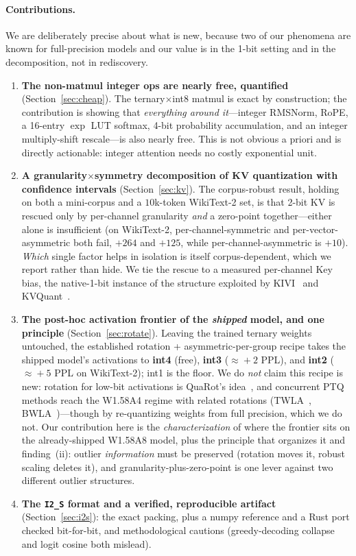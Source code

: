 \documentclass[11pt]{article}
\begin{document}
\paragraph{Contributions.} We are deliberately precise about what is new, because
two of our phenomena are known for full-precision models and our value is in the
1-bit setting and in the decomposition, not in rediscovery.
\begin{enumerate}
\item \textbf{The non-matmul integer ops are nearly free, quantified}
(Section~\ref{sec:cheap}). The ternary$\times$int8 matmul is exact by construction;
the contribution is showing that \emph{everything around it}---integer RMSNorm,
RoPE, a 16-entry $\exp$ LUT softmax, 4-bit probability accumulation, and an integer
multiply-shift rescale---is also nearly free. This is not obvious a priori and is
directly actionable: integer attention needs no costly exponential unit.
\item \textbf{A granularity$\times$symmetry decomposition of KV quantization with
confidence intervals} (Section~\ref{sec:kv}). The corpus-robust result, holding on
both a mini-corpus and a $10$k-token WikiText-2 set, is that 2-bit KV is rescued only
by per-channel granularity \emph{and} a zero-point together---either alone is
insufficient (on WikiText-2, per-channel-symmetric and per-vector-asymmetric both
fail, $+264$ and $+125$, while per-channel-asymmetric is $+10$). \emph{Which} single
factor helps in isolation is itself corpus-dependent, which we report rather than
hide. We tie the rescue to a measured per-channel Key bias, the native-1-bit instance
of the structure exploited by KIVI~\cite{liu2024kivi} and KVQuant~\cite{hooper2024kvquant}.
\item \textbf{The post-hoc activation frontier of the \emph{shipped} model, and one
principle} (Section~\ref{sec:rotate}). Leaving the trained ternary weights untouched,
the established rotation + asymmetric-per-group recipe takes the shipped model's
activations to \textbf{int4} (free), \textbf{int3} ($\approx\!+2$ PPL), and
\textbf{int2} ($\approx\!+5$ PPL on WikiText-2); int1 is the floor. We do \emph{not}
claim this recipe is new: rotation for low-bit activations is QuaRot's
idea~\cite{ashkboos2024quarot}, and concurrent PTQ methods reach the W1.58A4 regime
with related rotations (TWLA~\cite{li2026twla}, BWLA~\cite{wang2026bwla})---though by
re-quantizing weights from full precision, which we do not. Our contribution here is
the \emph{characterization} of where the frontier sits on the already-shipped
W1.58A8 model, plus the principle that organizes it and finding~(ii): outlier
\emph{information} must be preserved (rotation moves it, robust scaling deletes it),
and granularity-plus-zero-point is one lever against two different outlier
structures.
\item \textbf{The \texttt{I2\_S} format and a verified, reproducible artifact}
(Section~\ref{sec:i2s}): the exact packing, plus a numpy reference and a Rust port
checked bit-for-bit, and methodological cautions (greedy-decoding collapse and logit
cosine both mislead).
\end{enumerate}
\end{document}
